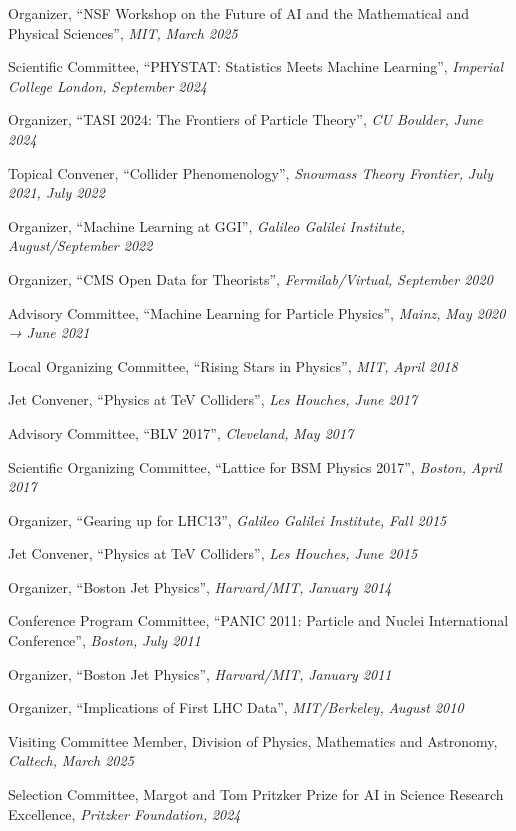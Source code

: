 \item Organizer, ``NSF Workshop on the Future of AI and the Mathematical and Physical Sciences'', \emph{MIT, }\emph{March 2025}
\item Scientific Committee, ``PHYSTAT: Statistics Meets Machine Learning'', \emph{Imperial College London, }\emph{September 2024}
\item Organizer, ``TASI 2024: The Frontiers of Particle Theory'', \emph{CU Boulder, }\emph{June 2024}
\item Topical Convener, ``Collider Phenomenology'', \emph{Snowmass Theory Frontier, }\emph{July 2021, July 2022}
\item Organizer, ``Machine Learning at GGI'', \emph{Galileo Galilei Institute, }\emph{August/September 2022}
\item Organizer, ``CMS Open Data for Theorists'', \emph{Fermilab/Virtual, }\emph{September 2020}
\item Advisory Committee, ``Machine Learning for Particle Physics'', \emph{Mainz, }\emph{May 2020 → June 2021}
\item Local Organizing Committee, ``Rising Stars in Physics'', \emph{MIT, }\emph{April 2018}
\item Jet Convener, ``Physics at TeV Colliders'', \emph{Les Houches, }\emph{June 2017}
\item Advisory Committee, ``BLV 2017'', \emph{Cleveland, }\emph{May 2017}
\item Scientific Organizing Committee, ``Lattice for BSM Physics 2017'', \emph{Boston, }\emph{April 2017}
\item Organizer, ``Gearing up for LHC13'', \emph{Galileo Galilei Institute, }\emph{Fall 2015}
\item Jet Convener, ``Physics at TeV Colliders'', \emph{Les Houches, }\emph{June 2015}
\item Organizer, ``Boston Jet Physics'', \emph{Harvard/MIT, }\emph{January 2014}
\item Conference Program Committee, ``PANIC 2011: Particle and Nuclei International Conference'', \emph{Boston, }\emph{July 2011}
\item Organizer, ``Boston Jet Physics'', \emph{Harvard/MIT, }\emph{January 2011}
\item Organizer, ``Implications of First LHC Data'', \emph{MIT/Berkeley, }\emph{August 2010}
\item Visiting Committee Member, Division of Physics, Mathematics and Astronomy, \emph{Caltech, }\emph{March 2025}
\item Selection Committee, Margot and Tom Pritzker Prize for AI in Science Research Excellence, \emph{Pritzker Foundation, }\emph{2024}
